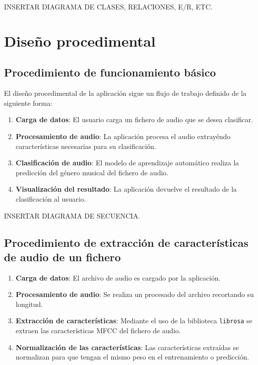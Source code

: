 INSERTAR DIAGRAMA DE CLASES, RELACIONES, E/R, ETC.

\section{Diseño procedimental}

\subsection{Procedimiento de funcionamiento básico}

El diseño procedimental de la aplicación sigue un flujo de trabajo definido de la siguiente forma:

\begin{enumerate}
\tightlist

\item \textbf{Carga de datos}: El usuario carga un fichero de audio que se desea clasificar.

\item \textbf{Procesamiento de audio}: La aplicación procesa el audio extrayéndo características necesarias para su clasificación.

\item \textbf{Clasificación de audio}: El modelo de aprendizaje automático realiza la predicción del género musical del fichero de audio.

\item \textbf{Visualización del resultado}: La aplicación devuelve el resultado de la clasificación al usuario.

\end{enumerate}

INSERTAR DIAGRAMA DE SECUENCIA.

\subsection{Procedimiento de extracción de características de audio de un fichero}

\begin{enumerate}
\tightlist

\item \textbf{Carga de datos}: El archivo de audio es cargado por la aplicación.

\item \textbf{Procesamiento de audio}: Se realiza un procesado del archivo recortando su longitud.

\item \textbf{Extracción de características}: Mediante el uso de la biblioteca \texttt{librosa} se extraen las características MFCC del fichero de audio.

\item \textbf{Normalización de las características}: Las características extraídas se normalizan para que tengan el mismo peso en el entrenamiento o predicción.

\end{enumerate}

